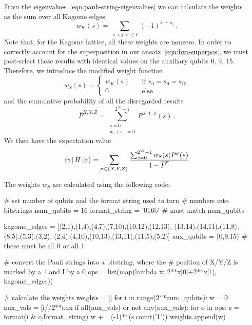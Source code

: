 \documentclass[a4paper,12pt]{article}
\begin{document}
From the eigenvalues~\eqref{eqn:pauli-string-eigenvalues} we can calculate the weights as the sum over all Kagome edges
\begin{equation}
w_K(s) = \sum_{<i,j> \in \Gamma} (-1)^{s_i + s_j} \,.
\end{equation}
Note that, for the Kagome lattice, all these weights are nonzero.
In order to correctly account for the superposition in our ansatz~\eqref{eqn:hva-superpos}, we must post-select those results with identical values on the auxiliary qubits 0, 9, 15. Therefore, we introduce the modified weight function
\begin{equation}
w_S(s) = \begin{cases}
w_K(s) &\quad \text{if } s_0 = s_9 = s_{15} \\
0 &\quad \text{else}
\end{cases}
\end{equation}
and the cumulative probability of all the disregarded results
\begin{equation}
\overline{P}^{X,Y,Z} = \sum_{\substack{s = 0\\w_S(s) = 0}}^{2^{16}-1} P^{X,Y,Z}(s) \,.
\end{equation}
We then have the expectation value
\begin{equation}
\left\langle{\psi}\right\vert H \left\vert{\psi}\right\rangle = \sum_{\sigma \in \{X,Y,Z\}} \frac{\sum_{s=0}^{2^{16}-1} w_S(s) P^\sigma(s)}{1 - \overline{P}^\sigma}
\end{equation}

The weights $w_S$ are calculated using the following code:
\begin{python}
# set number of qubits and the format string used to turn
# numbers into bitstrings
num_qubits = 16
format_string = '016b' # must match num_qubits

kagome_edges = [(2,1),(1,4),(4,7),(7,10),(10,12),(12,13),
                (13,14),(14,11),(11,8),(8,5),(5,3),(3,2),
                (2,4),(4,10),(10,13),(13,11),(11,5),(5,2)]
aux_qubits = (0,9,15) # these must be all 0 or all 1

# convert the Pauli strings into a bitstring, where the
# position of X/Y/Z is marked by a 1 and I by a 0
ops = list(map(lambda x: 2**x[0]+2**x[1], kagome_edges))

# calculate the weights
weights = []
for i in range(2**num_qubits):
    w = 0
    aux_vals = [i//2**aux%
    if all(aux_vals) or not any(aux_vals):
        for o in ops:
            s = format(i & o,format_string)
            w += (-1)**(s.count('1'))
    weights.append(w)
\end{python}
\end{document}
